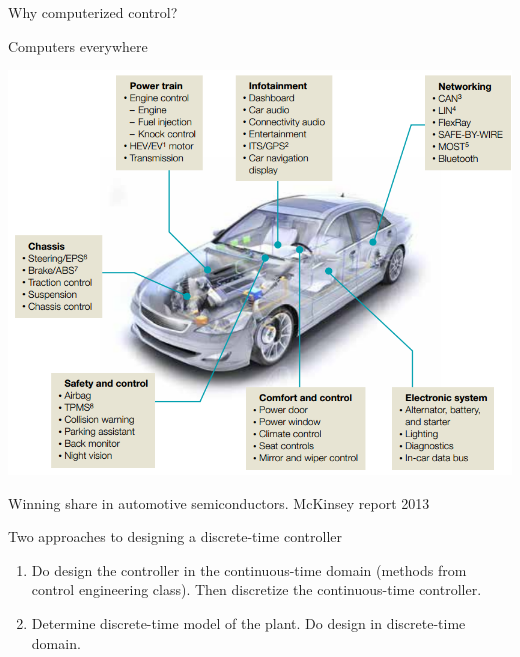 \documentclass[presentation,aspectratio=169]{beamer}
\begin{document}
\begin{frame}[label=sec-2-4]{Why computerized control?}
\end{frame}

\begin{frame}[label=sec-2-5]{Computers everywhere}
\begin{center}
\includegraphics[width=0.7\linewidth]{../../figures/electronics-in-cars.png}
\end{center}
{\tiny Winning share in automotive semiconductors. McKinsey report 2013 } 
\end{frame}

\begin{frame}[label=sec-2-6]{Two approaches to designing a  discrete-time controller}
\begin{enumerate}
\item Do design the controller in the continuous-time domain (methods from control engineering class). Then discretize the continuous-time controller.
\item Determine discrete-time model of the plant. Do design in discrete-time domain.
\end{enumerate}
\end{frame}
\end{document}

